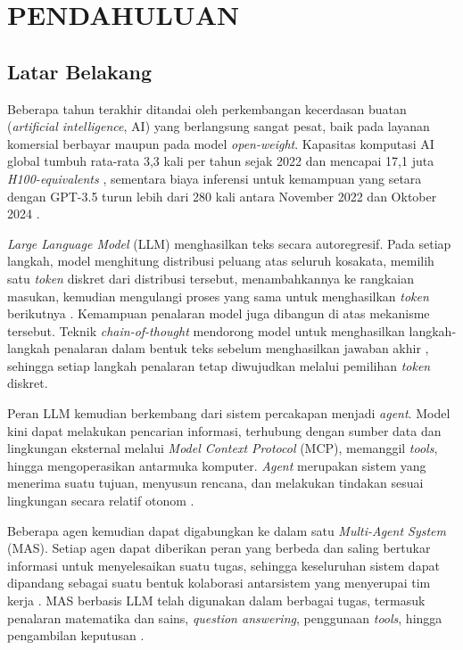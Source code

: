 \setcounter{page}{1}
\chapter{PENDAHULUAN}

\section{Latar Belakang}

Beberapa tahun terakhir ditandai oleh perkembangan kecerdasan buatan
(\textit{artificial intelligence}, AI) yang berlangsung sangat pesat, baik
pada layanan komersial berbayar maupun pada model \textit{open-weight}.
Kapasitas komputasi AI global tumbuh rata-rata 3,3 kali per tahun sejak 2022
dan mencapai 17,1 juta \textit{H100-equivalents} \citep{aiindex2026},
sementara biaya inferensi untuk kemampuan yang setara dengan GPT-3.5 turun
lebih dari 280 kali antara November 2022 dan Oktober 2024 \citep{aiindex2025}.

\textit{Large Language Model} (LLM) menghasilkan teks secara autoregresif.
Pada setiap langkah, model menghitung distribusi peluang atas seluruh
kosakata, memilih satu \textit{token} diskret dari distribusi tersebut,
menambahkannya ke rangkaian masukan, kemudian mengulangi proses yang sama
untuk menghasilkan \textit{token} berikutnya \citep{vaswani}. Kemampuan
penalaran model juga dibangun di atas mekanisme tersebut. Teknik
\textit{chain-of-thought} mendorong model untuk menghasilkan langkah-langkah
penalaran dalam bentuk teks sebelum menghasilkan jawaban akhir
\citep{wei}, sehingga setiap langkah penalaran tetap diwujudkan melalui
pemilihan \textit{token} diskret.

Peran LLM kemudian berkembang dari sistem percakapan menjadi \textit{agent}.
Model kini dapat melakukan pencarian informasi, terhubung dengan sumber data
dan lingkungan eksternal melalui \textit{Model Context Protocol} (MCP),
memanggil \textit{tools}, hingga mengoperasikan antarmuka komputer.
\textit{Agent} merupakan sistem yang menerima suatu tujuan, menyusun rencana,
dan melakukan tindakan sesuai lingkungan secara relatif otonom
\citep{russellnorvig}.

Beberapa agen kemudian dapat digabungkan ke dalam satu \textit{Multi-Agent
System} (MAS). Setiap agen dapat diberikan peran yang berbeda dan saling
bertukar informasi untuk menyelesaikan suatu tugas, sehingga keseluruhan
sistem dapat dipandang sebagai suatu bentuk kolaborasi antarsistem yang
menyerupai tim kerja \citep{wooldridge}. MAS berbasis LLM telah digunakan
dalam berbagai tugas, termasuk penalaran matematika dan sains,
\textit{question answering}, penggunaan \textit{tools}, hingga pengambilan
keputusan \citep{guo}.

